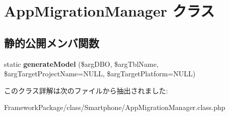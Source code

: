 \hypertarget{class_app_migration_manager}{}\section{App\+Migration\+Manager クラス}
\label{class_app_migration_manager}
\subsection*{静的公開メンバ関数}
\begin{DoxyCompactItemize}
\item 
\hypertarget{class_app_migration_manager_a89d31f9c8565b07f429587531a4d08ad}{}static {\bfseries generate\+Model} (\$arg\+D\+B\+O, \$arg\+Tbl\+Name, \$arg\+Target\+Project\+Name=N\+U\+L\+L, \$arg\+Target\+Platform=N\+U\+L\+L)\label{class_app_migration_manager_a89d31f9c8565b07f429587531a4d08ad}

\end{DoxyCompactItemize}


このクラス詳解は次のファイルから抽出されました\+:\begin{DoxyCompactItemize}
\item 
Framework\+Package/class/\+Smartphone/App\+Migration\+Manager.\+class.\+php\end{DoxyCompactItemize}
